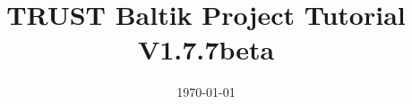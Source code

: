 \documentclass[10pt, hyperref={unicode=true,pdfusetitle, bookmarks=true,bookmarksnumbered=false,bookmarksopen=false, breaklinks=false,pdfborder={0 0 1},backref=true,colorlinks=true,linkcolor=darkblue,pageanchor, urlcolor=darkblue}]{beamer}
\title[TRUST Baltik Project Tutorial V1.7.7beta]{TRUST Baltik Project Tutorial V1.7.7beta}
\institute[CEA/DEN/DANS/DM2S/STMF] %
{
CEA Saclay \\ %
\medskip
\textit{Support team: triou@cea.fr} %
\medskip
}
\date{\today} %
\begin{document}
\begin{frame}
\titlepage %
\end{frame}

\begin{frame}
\tableofcontents [hideallsubsections]
\end{frame}
\end{document}
